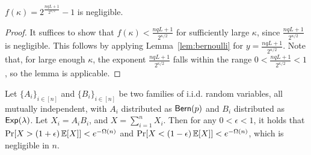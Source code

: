 \begin{lemma}
  $f(\kappa) = 2^{\frac{nqL + 1}{2^{\kappa/2}}} - 1$ is negligible.
\end{lemma}
\begin{proof}
  It suffices to show that $f(\kappa) < \frac{nqL + 1}{2^{\kappa/2}}$
  for sufficiently large $\kappa$, since $\frac{nqL + 1}{2^{\kappa/2}}$
  is negligible.
  This follows by applying Lemma~\ref{lem:bernoulli} for $y = \frac{nqL + 1}{2^{\kappa/2}}$.
  Note that, for large enough $\kappa$, the exponent $\frac{nqL + 1}{2^{\kappa/2}}$
  falls within the range $0 < \frac{nqL + 1}{2^{\kappa/2}} < 1$,
  so the lemma is applicable.
  \Qed
\end{proof}

\begin{theorem}\label{thm:bern-exp}
  Let $\{ A_i \}_{i \in [n]}$ and $\{ B_i \}_{i \in [n]}$ be two families of i.i.d. random variables,
  all mutually independent,
  with $A_i$ distributed as $\textsf{Bern}(p)$ and $B_i$ distributed as $\textsf{Exp}(\lambda)$.
  Let $X_i = A_i B_i$, and $X = \sum_{i = 1}^n X_i$.
  Then for any $0 < \epsilon < 1$, it holds that
  $\Pr[X > (1 + \epsilon) \mathop{{}\mathbb{E}}[X]] < e^{-\Omega(n)}$ and
  $\Pr[X < (1 - \epsilon) \mathop{{}\mathbb{E}}[X]] < e^{-\Omega(n)}$,
  which is negligible in $n$.
\end{theorem}
